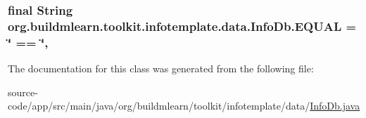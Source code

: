 \subsubsection[{\texorpdfstring{E\+Q\+U\+AL}{EQUAL}}]{\setlength{\rightskip}{0pt plus 5cm}final String org.\+buildmlearn.\+toolkit.\+infotemplate.\+data.\+Info\+Db.\+E\+Q\+U\+AL = \char`\"{} == \char`\"{}\hspace{0.3cm}{\ttfamily [static]}, {\ttfamily [private]}}\hypertarget{classorg_1_1buildmlearn_1_1toolkit_1_1infotemplate_1_1data_1_1InfoDb_aa6bd5fe405d5b4135431ba5c04ce1d8a}{}\label{classorg_1_1buildmlearn_1_1toolkit_1_1infotemplate_1_1data_1_1InfoDb_aa6bd5fe405d5b4135431ba5c04ce1d8a}


The documentation for this class was generated from the following file\+:\begin{DoxyCompactItemize}
\item 
source-\/code/app/src/main/java/org/buildmlearn/toolkit/infotemplate/data/\hyperlink{InfoDb_8java}{Info\+Db.\+java}\end{DoxyCompactItemize}
